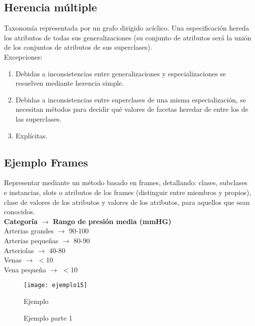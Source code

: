 \documentclass[12pt]{article}
\begin{document}
\subsection{Herencia múltiple}
Taxonomía representada por un grafo dirigido acíclico. Una especificación hereda los atributos de todas sus generalizaciones (su conjunto de atributos será la unión de los conjuntos de atributos de sus superclases).\\
Excepciones:
\begin{enumerate}
\item Debidas a inconsistencias entre generalizaciones y especializaciones se resuelven mediante herencia simple.
\item Debidas a inconsistencias entre superclases de una misma especialización, se necesitan métodos para decidir qué valores de facetas heredar de entre los de las superclases.
\item Explícitas.
\end{enumerate}

\subsection{Ejemplo Frames}
Representar mediante un método basado en frames, detallando: clases, subclases e instancias, slots o atributos de los frames (distinguir entre miembros y propios), clase de valores de los atributos y valores de los atributos, para aquellos que sean conocidos.\\
\textbf{Categoría} $\longrightarrow$ \textbf{Rango de presión media (mmHG)}\\
Arterias grandes $\longrightarrow$ 90-100\\
Arterias pequeñas $\longrightarrow$ 80-90\\
Arteriolas $\longrightarrow$ 40-80\\
Venas $\longrightarrow$ $<$10\\
Vena pequeña $\longrightarrow$ $<$10\\

\begin{figure}[H]
\centering
\texttt{[image: ejemplo15]}
\caption{Ejemplo}
\label{fig:ejemplo15}
\end{figure}

\begin{figure}[H]
 \centering
 \caption{Ejemplo parte 1}
 \label{f:ejemplop1}
\end{figure}
\end{document}
